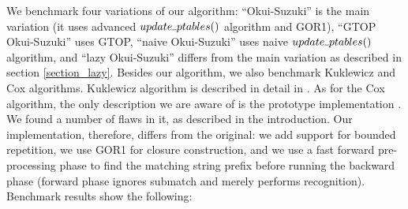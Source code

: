 \documentclass[AMA,STIX1COL]{WileyNJD-v2}
\newcommand{\Xund}{\rule{.4em}{.4pt}}
\begin{document}
We benchmark four variations of our algorithm:
``Okui-Suzuki'' is the main variation (it uses advanced $update \Xund ptables ()$ algorithm and GOR1),
``GTOP Okui-Suzuki'' uses GTOP,
``naive Okui-Suzuki'' uses naive $update \Xund ptables ()$ algorithm,
and ``lazy Okui-Suzuki'' differs from the main variation as described in section \ref{section_lazy}.
%
Besides our algorithm, we also benchmark Kuklewicz and Cox algorithms.
Kuklewicz algorithm is described in detail in \cite{Tro17}.
As for the Cox algorithm, the only description we are aware of is the prototype implementation \cite{Cox09}.
We found a number of flaws in it, as described in the introduction.
Our implementation, therefore, differs from the original:
we add support for bounded repetition,
we use GOR1 for closure construction,
and we use a fast forward pre-processing phase to find the matching string prefix before running the backward phase
(forward phase ignores submatch and merely performs recognition).
%
Benchmark results show the following:
\\[-0.5em]
\end{document}
